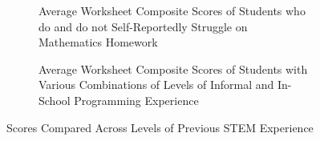 { \begin{figure}
     \centering
    \begin{subfigure}[t]{0.49\textwidth}
        \caption{Average \ts Worksheet Composite Scores of Students who do and do not Self-Reportedly Struggle on Mathematics Homework}
    \end{subfigure}
    \hfill
    \begin{subfigure}[t]{0.49\textwidth}
    \caption{Average \ts Worksheet Composite Scores of Students with Various Combinations of Levels of Informal and In-School Programming Experience} 
    \end{subfigure}
    \caption{\ts Scores Compared Across Levels of Previous STEM Experience}
    \label{fig:math_programming}
\end{figure}

}
